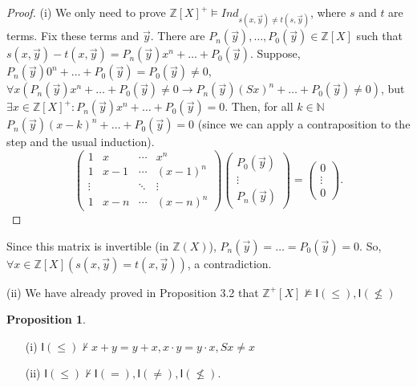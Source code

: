\documentclass[a4paper,14pt]{article}
\theoremstyle{definition}
\theoremstyle{theorem}
\theoremstyle{lemma}
\theoremstyle{proposition}
\newtheorem{proposition}{Proposition}[section]
\theoremstyle{remark}
\theoremstyle{corollary}
\theoremstyle{problem}
\theoremstyle{hypothesis}
\begin{document}
\begin{proof}
    (i) We only need to prove $\mathbb Z[X]^+ \vDash Ind_{s(x, \vec y) \ne t(s, \vec y)}$, where $s$ and $t$ are terms. Fix these terms and $\vec y$. There are $P_n(\vec y), \dots, P_0(\vec y) \in \mathbb Z[X]$ such that $s(x, \vec y) - t(x, \vec y) = P_n(\vec y) x^n + \dots + P_0(\vec y)$. Suppose, $P_n(\vec y) 0^n + \dots + P_0(\vec y) = P_0(\vec y) \ne 0$, $\forall x (P_n(\vec y) x^n + \dots + P_0(\vec y) \ne 0 \rightarrow P_n(\vec y) (S x)^n + \dots + P_0(\vec y) \ne 0)$, but $\exists x \in \mathbb Z[X]^+: P_n(\vec y) x^n + \dots + P_0(\vec y) = 0$. Then, for all $k \in \mathbb N$ $P_n(\vec y) (x - k)^n + \dots + P_0(\vec y) = 0$ (since we can apply a contraposition to the step and the usual induction). 
    $$
    \begin{pmatrix}
    1 & x & \cdots & x^n \\
    1 & x - 1 & \cdots & (x - 1)^n \\
    \vdots & & \ddots & \vdots \\
    1 & x - n & \cdots & (x - n)^n
    \end{pmatrix}
    \begin{pmatrix}
    P_0(\vec y) \\
    \vdots \\
    P_n(\vec y)
    \end{pmatrix}
    =
    \begin{pmatrix}
    0 \\
    \vdots \\
    0
    \end{pmatrix}.
    $$
\end{proof}

Since this matrix is invertible (in $\mathbb Z (X)$), $P_n (\vec y) = \dots = P_0(\vec y) = 0$. So, $\forall x \in \mathbb{Z}[X] (s(x, \vec y) = t(x, \vec y))$, a contradiction.

(ii) We have already proved in Proposition 3.2 that $\mathbb Z^+ [X] \nvDash \mathsf I(\leqslant), \mathsf I(\nleqslant)$

\begin{proposition}
\begin{enumerate}
    \item[(i)] $\mathsf I (\leqslant) \nvdash x + y = y + x, x \cdot y = y \cdot x, S x \ne x$
    \item[(ii)] $\mathsf I (\leqslant) \nvdash \mathsf I (=), \mathsf I (\ne), \mathsf I (\nleqslant)$.
\end{enumerate}
\end{proposition}
\end{document}
